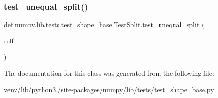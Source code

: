 \mbox{\label{classnumpy_1_1lib_1_1tests_1_1test__shape__base_1_1TestSplit_a3712845474b73624a146513ec18208c2}} 
\subsubsection{\texorpdfstring{test\+\_\+unequal\+\_\+split()}{test\_unequal\_split()}}
{\footnotesize\ttfamily def numpy.\+lib.\+tests.\+test\+\_\+shape\+\_\+base.\+Test\+Split.\+test\+\_\+unequal\+\_\+split (\begin{DoxyParamCaption}\item[{}]{self }\end{DoxyParamCaption})}



The documentation for this class was generated from the following file\+:\begin{DoxyCompactItemize}
\item 
venv/lib/python3./site-\/packages/numpy/lib/tests/\hyperlink{lib_2tests_2test__shape__base_8py}{test\+\_\+shape\+\_\+base.\+py}\end{DoxyCompactItemize}
